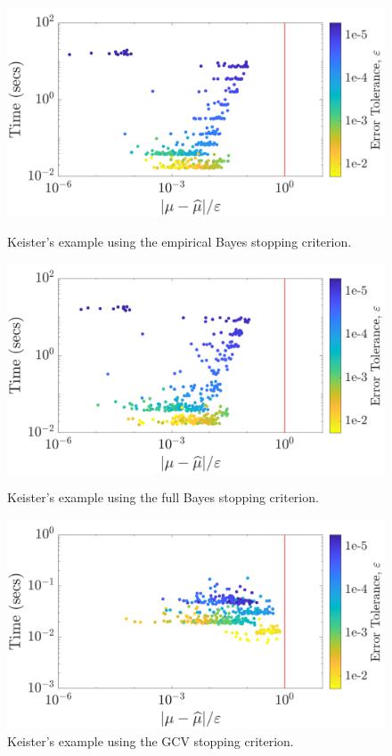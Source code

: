 \documentclass{svjour3}                     %
\begin{document}
\begin{figure}
	\centering
	\includegraphics[width=0.95\linewidth]{"Lattice_Keister_guaranteed_time_MLE_C1sin_d4_r2_2019-Jun-27"}
	\caption[Keister guaranteed:MLE]{Keister's example using the empirical Bayes stopping criterion.}
	\label{fig:keister-guaranteed-MLE}
	\centering
	\includegraphics[width=0.95\linewidth]{"Lattice_Keister_guaranteed_time_full_C1sin_d4_r2_2019-Jun-27"}
	\caption[Keister guaranteed:FB]{Keister's example using the full Bayes stopping criterion.}
	\label{fig:keister-guaranteed-FB}
	\centering
	\includegraphics[width=0.95\linewidth]{"Lattice_Keister_guaranteed_time_GCV_C1sin_d4_r2_2019-Jun-27"}
	\caption[Keister guaranteed:GCV]{Keister's example using the GCV stopping criterion.}
	\label{fig:keister-guaranteed-GCV}
\end{figure}
\end{document}
